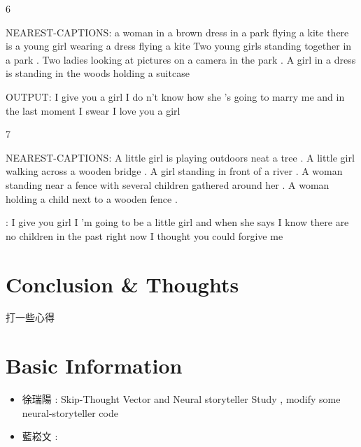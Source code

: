\documentclass{article}
\begin{document}
6

NEAREST-CAPTIONS:
a woman in a brown dress in a park flying a kite
there is a young girl wearing a dress flying a kite
Two young girls standing together in a park .
Two ladies looking at pictures on a camera in the park .
A girl in a dress is standing in the woods holding a suitcase

OUTPUT:
I give you a girl
I do n't know how she 's going to marry me
and
in the last moment
I swear
I love you a girl

7

NEAREST-CAPTIONS:
A little girl is playing outdoors neat a tree .
A little girl walking across a wooden bridge .
A girl standing in front of a river .
A woman standing near a fence with several children gathered around her .
A woman holding a child next to a wooden fence .

:
I give you girl
I 'm going to be a little girl
and when she says
I know there are no children in the past
right now
I thought you could forgive me

\section{Conclusion \& Thoughts}
打一些心得

\section{Basic Information}
\begin{itemize}
    \item 徐瑞陽 : Skip-Thought Vector and Neural storyteller Study , modify some neural-storyteller code
    \item 藍崧文 : 
\end{itemize}
\medskip



\end{document}
